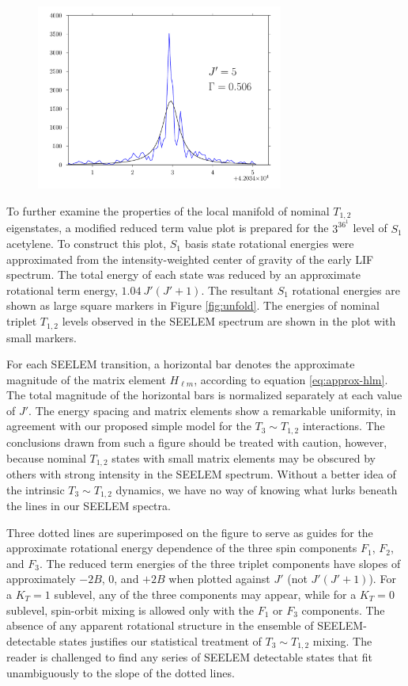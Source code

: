 \documentclass[12pt]{mitthesis}
\begin{document}
\begin{figure}
  \includegraphics[width=3.2in]{3361-q5-seelemfit}
\end{figure}


To further examine the properties of the local manifold of nominal
$T_{1,2}$ eigenstates, a modified reduced term value plot is prepared
for the $3^36^1$  level of $S_1$ acetylene.  To construct this
plot, $S_1$ basis state rotational energies were approximated from the
intensity-weighted center of gravity of the early LIF spectrum.  The
total energy of each state was reduced by an approximate rotational
term energy, $1.04 \: J'(J'+1)$.  The resultant $S_1$ rotational
energies are shown as large square markers in Figure \ref{fig:unfold}.
The energies of nominal triplet $T_{1,2}$ levels observed in the
SEELEM spectrum are shown in the plot with small markers.

For each SEELEM transition, a horizontal bar denotes the approximate
magnitude of the matrix element $H_{\ell m}$, according to equation
\ref{eq:approx-hlm}.  The total magnitude of the horizontal bars is
normalized separately at each value of $J'$.  The energy spacing and
matrix elements show a remarkable uniformity, in agreement with our
proposed simple model for the $T_3 \sim T_{1,2}$ interactions.  The
conclusions drawn from such a figure should be treated with caution,
however, because nominal $T_{1,2}$ states with small matrix elements
may be obscured by others with strong intensity in the SEELEM
spectrum.  Without a better idea of the intrinsic $T_3 \sim T_{1,2}$
dynamics, we have no way of knowing what lurks beneath the lines in
our SEELEM spectra.

Three dotted lines are superimposed on the figure to serve as guides
for the approximate rotational energy dependence of the three spin
components $F_1$, $F_2$, and $F_3$.  The reduced term energies of the
three triplet components have slopes of approximately $-2B$, 0, and
$+2B$ when plotted against $J'$ (not $J'(J'+1)$).  For a $K_T=1$
sublevel, any of the three components may appear, while for a $K_T=0$
sublevel, spin-orbit mixing is allowed only with the $F_1$ or $F_3$
components.  The absence of any apparent rotational structure in the
ensemble of SEELEM-detectable states justifies our statistical
treatment of $T_3 \sim T_{1,2}$ mixing.  The reader is challenged to
find any series of SEELEM detectable states that fit unambiguously to
the slope of the dotted lines.
\end{document}
